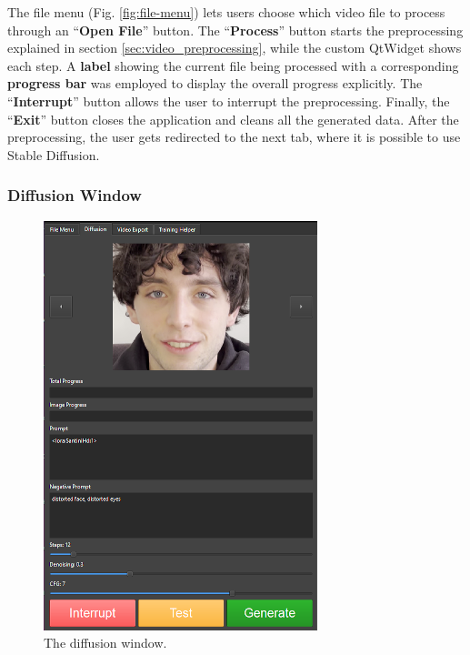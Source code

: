 \documentclass[preprint]{elsarticle}
\begin{document}
The file menu (Fig. \ref{fig:file-menu}) lets users choose which video file to process through 
an ``\textbf{Open File}'' button. 
The ``\textbf{Process}'' button starts the preprocessing explained in section \ref{sec:video_preprocessing}, 
while the custom QtWidget shows each step. 
A \textbf{label} showing the current file being processed with a corresponding \textbf{progress bar} 
was employed to display the overall progress explicitly. 
The ``\textbf{Interrupt}'' button allows the user to interrupt the preprocessing. 
Finally, the ``\textbf{Exit}'' button closes the application and cleans all the generated data. 
After the preprocessing, the user gets redirected to the next tab,
where it is possible to use Stable Diffusion. 



\subsubsection{Diffusion Window}

\begin{figure}[H]
	\centering
	\includegraphics[scale=0.4, keepaspectratio]{img/project_img/generation-window.png}
	\caption{The diffusion window.}
	\label{fig:diffusion-menu}
\end{figure}
\end{document}
